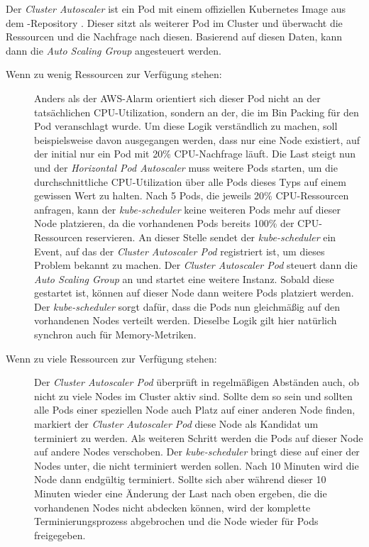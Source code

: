 Der \emph{Cluster Autoscaler} ist ein Pod mit einem offiziellen Kubernetes Image aus dem
-Repository \cite{contrib}. Dieser sitzt als weiterer Pod im
Cluster und überwacht die Ressourcen und die Nachfrage nach diesen.
Basierend auf diesen Daten, kann dann die \emph{Auto Scaling Group}
angesteuert werden.

\begin{description}
  \item[Wenn zu wenig Ressourcen zur Verfügung stehen:]
  Anders als der AWS-Alarm orientiert sich dieser Pod nicht an der tatsächlichen
  CPU-Utilization, sondern an der, die im Bin Packing für den Pod
  veranschlagt wurde.
  Um diese Logik verständlich zu machen, soll beispielsweise davon
  ausgegangen werden,
  dass nur eine Node existiert, auf der initial nur ein Pod mit 20\%
  CPU-Nachfrage läuft.
  Die Last steigt nun und der \emph{Horizontal Pod Autoscaler} muss weitere
  Pods starten,
  um die durchschnittliche CPU-Utilization über alle Pods dieses Typs auf
  einem gewissen Wert zu halten.
  Nach 5 Pods, die jeweils 20\% CPU-Ressourcen anfragen, kann
  der \emph{kube-scheduler}
  keine weiteren Pods mehr auf dieser Node platzieren, da die vorhandenen Pods
  bereits 100\% der CPU-Ressourcen reservieren.
  An dieser Stelle sendet der \emph{kube-scheduler} ein Event, auf das
  der \emph{Cluster Autoscaler Pod} registriert ist, um dieses Problem bekannt
  zu machen.
  Der \emph{Cluster Autoscaler Pod} steuert dann die \emph{Auto Scaling Group} an
  und startet eine weitere Instanz.
  Sobald diese gestartet ist, können auf dieser Node dann weitere
  Pods platziert werden. Der \emph{kube-scheduler} sorgt dafür, dass die Pods nun
  gleichmäßig auf den vorhandenen Nodes verteilt werden.
  Dieselbe Logik gilt hier natürlich synchron auch für Memory-Metriken.

  \item[Wenn zu viele Ressourcen zur Verfügung stehen:]
  Der \emph{Cluster Autoscaler Pod} überprüft in regelmäßigen Abständen auch, ob nicht
  zu viele Nodes im Cluster aktiv sind. Sollte dem so sein und sollten alle Pods
  einer speziellen Node auch Platz auf einer anderen Node finden, markiert
  der \emph{Cluster Autoscaler Pod}
  diese Node als Kandidat um terminiert zu werden.
  Als weiteren Schritt werden die Pods auf dieser Node auf andere Nodes verschoben.
  Der \emph{kube-scheduler} bringt diese auf einer der Nodes unter, die
  nicht terminiert werden sollen.
  Nach 10 Minuten wird die Node dann endgültig terminiert. Sollte sich aber
  während
  dieser 10 Minuten wieder eine Änderung der Last nach oben ergeben,
  die die vorhandenen Nodes nicht abdecken können, wird der komplette
  Terminierungsprozess abgebrochen und die Node wieder für Pods freigegeben.
\end{description}

